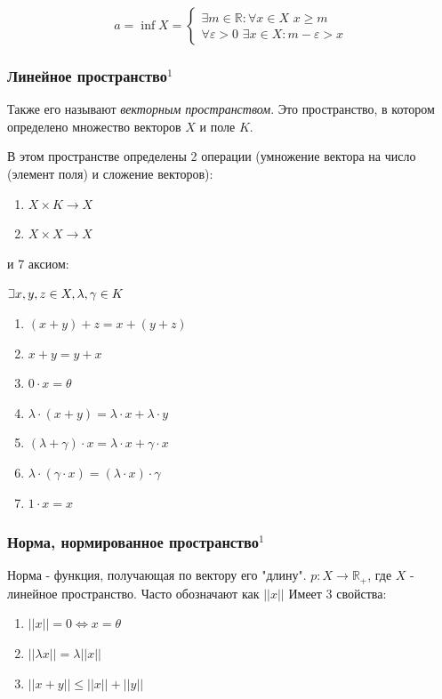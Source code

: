 \documentclass{article}
\def\letus{%
\mathord{\setbox0=\hbox{$\exists$}%
         \hbox{\kern 0.125\wd0%
               \vbox to \ht0{%
                  \hrule width 0.75\wd0%
                  \vfill%
                  \hrule width 0.75\wd0}%
               \vrule height \ht0%
               \kern 0.125\wd0}%
       }%
        }
\def\dbl{\,\,}
\begin{document}
$$
a = \inf X = 
\begin{cases}
\exists m \in \mathbb{R} : \forall x \in X \dbl x \ge m\\
\forall \varepsilon > 0 \dbl \exists x \in X : m - \varepsilon > x
\end{cases} 
$$

\subsubsection{Линейное пространство\texorpdfstring{$^1$}{}}
Также его называют \textit{векторным пространством}. Это пространство, в котором определено множество векторов $X$ и поле $K$.

В этом пространстве определены 2 операции (умножение вектора на число (элемент поля) и сложение векторов):
\begin{enumerate}
    \item $X\times K \rightarrow X$
    \item $X\times X \rightarrow X$
\end{enumerate}

и 7 аксиом:

$\letus x, y, z \in X, \lambda, \gamma \in K$
\begin{enumerate}
    \item $(x + y) + z = x + (y + z)$
    \item $x + y = y + x$
    \item $0 \cdot x = \theta$
    \item $\lambda \cdot (x + y) = \lambda \cdot x + \lambda \cdot y$
    \item $(\lambda + \gamma) \cdot x = \lambda \cdot x + \gamma \cdot x$
    \item $\lambda \cdot (\gamma \cdot x) = (\lambda \cdot x) \cdot \gamma$
    \item $1 \cdot x = x$
\end{enumerate}

\subsubsection{Норма, нормированное пространство\texorpdfstring{$^1$}{}}
Норма - функция, получающая по вектору его "длину". $p: X \rightarrow \mathbb{R}_+$, где $X$ - линейное пространство. Часто обозначают как $||x||$ Имеет 3 свойства:
\begin{enumerate}
    \item $||x|| = 0 \Leftrightarrow x = \theta$
    \item $||\lambda x|| = \lambda ||x||$
    \item $||x + y|| \le ||x|| + ||y||$
\end{enumerate}
\end{document}

